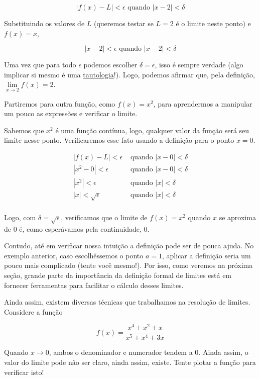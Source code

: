\documentclass[
  portuguese,
  letterpaper,
  DIV=11,
  numbers=noendperiod]{scrreport}
\begin{document}
\[
|f(x) - L| < \epsilon \text{ quando } |x-2| < \delta
\]

Substituindo os valores de \(L\) (queremos testar se \(L=2\) é o limite
neste ponto) e \(f(x) =x\),

\[
|x - 2| < \epsilon \text{ quando } |x-2| < \delta
\]

Uma vez que para todo \(\epsilon\) podemos escolher
\(\delta = \epsilon\), isso é sempre verdade (algo implicar si mesmo é
uma
\href{https://pt.wikipedia.org/wiki/Tautologia_(l\%C3\%B3gica)}{tautologia}!).
Logo, podemos afirmar que, pela definição,
\(\lim\limits_{x\rightarrow2}f(x) = 2\).

Partiremos para outra função, como \(f(x) = x^2\), para aprendermos a
manipular um pouco as expressões e verificar o limite.

Sabemos que \(x^2\) é uma função contínua, logo, qualquer valor da
função será seu limite nesse ponto. Verificaremos esse fato usando a
definição para o ponto \(x=0\).

\[
\begin{aligned}
|f(x) - L| < \epsilon &\text{ quando } |x-0| < \delta \\
|x^2 - 0| < \epsilon &\text{ quando } |x-0| < \delta \\
|x^2| < \epsilon &\text{ quando } |x| < \delta \\
|x| < \sqrt{\epsilon} &\text{ quando } |x| < \delta \\
\end{aligned}
\]

Logo, com \(\delta = \sqrt{\epsilon}\), verificamos que o limite de
\(f(x) = x^2\) quando \(x\) se aproxima de \(0\) é, como esperávamos
pela continuidade, \(0\).

Contudo, até em verificar nossa intuição a definição pode ser de pouca
ajuda. No exemplo anterior, caso escolhêssemos o ponto \(a=1\), aplicar
a definição seria um pouco mais complicado (tente você mesmo!). Por
isso, como veremos na próxima seção, grande parte da importância da
definição formal de limites está em fornecer ferramentas para facilitar
o cálculo desses limites.

Ainda assim, existem diversas técnicas que trabalhamos na resolução de
limites. Considere a função

\[
f(x) = \frac{x^4 + x^2 + x}{x^5 + x^4 + 3x}
\]

Quando \(x\rightarrow 0\), ambos o denominador e numerador tendem a 0.
Ainda assim, o valor do limite pode não ser claro, ainda assim, existe.
Tente plotar a função para verificar isto!
\end{document}
